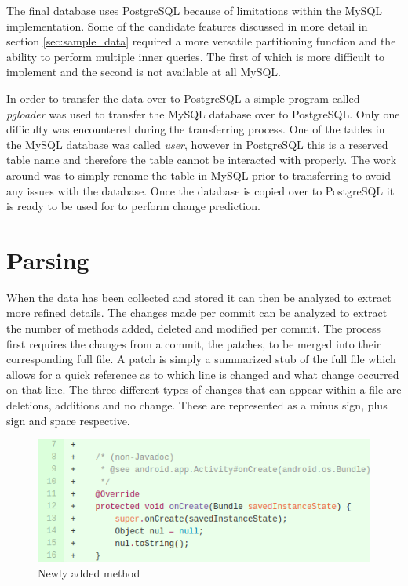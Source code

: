 The final database uses PostgreSQL because of limitations within the MySQL implementation. Some of the candidate features discussed in more detail in section \ref{sec:sample_data} required a more versatile partitioning function and the ability to perform multiple inner queries. The first of which is more difficult to implement and the second is not available at all MySQL.

In order to transfer the data over to PostgreSQL a simple program called \textit{pgloader} was used to transfer the MySQL database over to PostgreSQL. Only one difficulty was encountered during the transferring process. One of the tables in the MySQL database was called \textit{user}, however in PostgreSQL this is a reserved table name and therefore the table cannot be interacted with properly. The work around was to simply rename the table in MySQL prior to transferring to avoid any issues with the database. Once the database is copied over to PostgreSQL it is ready to be used for to perform change prediction.

\section{Parsing}
\label{sec:parsing}

When the data has been collected and stored it can then be analyzed to extract more refined details. The changes made per commit can be analyzed to extract the number of methods added, deleted and modified per commit. The process first requires the changes from a commit, the patches, to be merged into their corresponding full file. A patch is simply a summarized stub of the full file which allows for a quick reference as to which line is changed and what change occurred on that line. The three different types of changes that can appear within a file are deletions, additions and no change. These are represented as a minus sign, plus sign and space respective.

\begin{figure}[!ht]
    \centering
        \includegraphics[width=1.0\textwidth]{images/added_example}
    \caption{Newly added method}
    \label{fig:added_method}
\end{figure}


